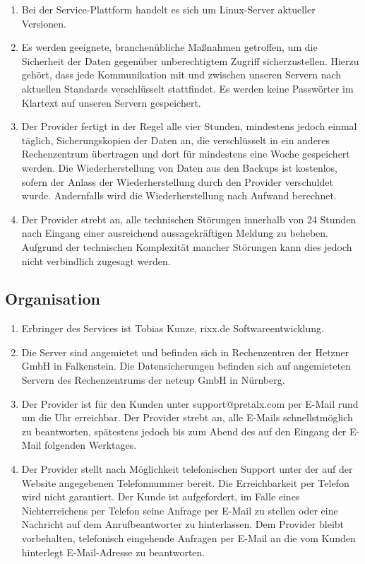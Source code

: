\documentclass{terms}
\begin{document}
\begin{enumerate}
\item Bei der Service-Plattform handelt es sich um Linux-Server aktueller Versionen.
\item Es werden geeignete, branchenübliche Maßnahmen getroffen, um die Sicherheit der Daten gegenüber unberechtigtem Zugriff sicherzustellen.
      Hierzu gehört, dass jede Kommunikation mit und zwischen unseren Servern nach aktuellen Standards verschlüsselt stattfindet.
      Es werden keine Passwörter im Klartext auf unseren Servern gespeichert.
\item Der Provider fertigt in der Regel alle vier Stunden, mindestens jedoch einmal täglich, Sicherungskopien der Daten an, die verschlüsselt in ein anderes Rechenzentrum übertragen und dort für mindestens eine Woche gespeichert werden.
      Die Wiederherstellung von Daten aus den Backups ist kostenlos, sofern der Anlass der Wiederherstellung durch den Provider verschuldet wurde.
      Andernfalls wird die Wiederherstellung nach Aufwand berechnet.
\item Der Provider strebt an, alle technischen Störungen innerhalb von 24 Stunden nach Eingang einer ausreichend aussagekräftigen Meldung zu beheben.
      Aufgrund der technischen Komplexität mancher Störungen kann dies jedoch nicht verbindlich zugesagt werden.
\end{enumerate}

\subsection{Organisation}
\begin{enumerate}
\item Erbringer des Services ist Tobias Kunze, rixx.de Softwareentwicklung.
\item Die Server sind angemietet und befinden sich in Rechenzentren der Hetzner GmbH in Falkenstein.
      Die Datensicherungen befinden sich auf angemieteten Servern des Rechenzentrums der netcup GmbH in Nürnberg.
\item Der Provider ist für den Kunden unter support@pretalx.com per E-Mail rund um die Uhr erreichbar.
      Der Provider strebt an, alle E-Mails schnellstmöglich zu beantworten, spätestens jedoch bis zum Abend des auf den Eingang der E-Mail folgenden Werktages.
\item Der Provider stellt nach Möglichkeit telefonischen Support unter der auf der Website angegebenen Telefonnummer bereit.
      Die Erreichbarkeit per Telefon wird nicht garantiert.
      Der Kunde ist aufgefordert, im Falle eines Nichterreichens per Telefon seine Anfrage per E-Mail zu stellen oder eine Nachricht auf dem Anrufbeantworter zu hinterlassen.
      Dem Provider bleibt vorbehalten, telefonisch eingehende Anfragen per E-Mail an die vom Kunden hinterlegt E-Mail-Adresse zu beantworten.
\end{enumerate}
\end{document}
